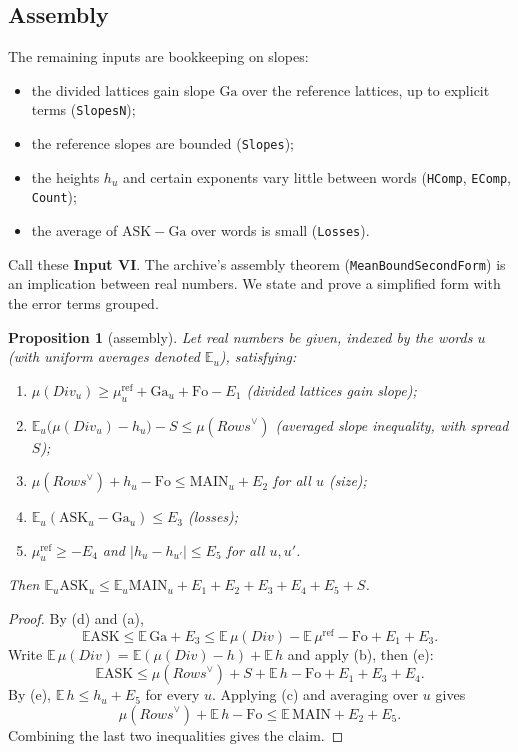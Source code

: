 \documentclass[11pt]{amsart}
\newtheorem{proposition}[theorem]{Proposition}
\theoremstyle{definition}
\theoremstyle{remark}
\newcommand{\dual}{^{\vee}}
\newcommand{\ASK}{\mathrm{ASK}}
\newcommand{\MAIN}{\mathrm{MAIN}}
\begin{document}
\subsection{Assembly}
The remaining inputs are bookkeeping on slopes:
\begin{itemize}
\item the divided lattices gain slope $\mathrm{Ga}$ over the reference lattices, up to explicit terms (\texttt{SlopesN});
\item the reference slopes are bounded (\texttt{Slopes});
\item the heights $h_u$ and certain exponents vary little between words (\texttt{HComp}, \texttt{EComp}, \texttt{Count});
\item the average of $\ASK-\mathrm{Ga}$ over words is small (\texttt{Losses}).
\end{itemize}
Call these \textbf{Input VI}. The archive's assembly theorem (\texttt{MeanBoundSecondForm}) is an implication between real numbers. We state and prove a simplified form with the error terms grouped.

\begin{proposition}[assembly]\label{prop:assembly}
Let real numbers be given, indexed by the words $u$ (with uniform averages denoted $\mathbb E_u$), satisfying:
\begin{enumerate}[label=(\alph*)]
\item $\mu(\mathit{Div}_u)\ge\mu^{\mathrm{ref}}_u+\mathrm{Ga}_u+\mathrm{Fo}-E_1$ (divided lattices gain slope);
\item $\mathbb E_u\bigl(\mu(\mathit{Div}_u)-h_u\bigr)-S\le\mu(\mathit{Rows}\dual)$ (averaged slope inequality, with spread $S$);
\item $\mu(\mathit{Rows}\dual)+h_u-\mathrm{Fo}\le\MAIN_u+E_2$ for all $u$ (size);
\item $\mathbb E_u(\ASK_u-\mathrm{Ga}_u)\le E_3$ (losses);
\item $\mu^{\mathrm{ref}}_u\ge-E_4$ and $|h_u-h_{u'}|\le E_5$ for all $u,u'$.
\end{enumerate}
Then $\mathbb E_u\ASK_u\le\mathbb E_u\MAIN_u+E_1+E_2+E_3+E_4+E_5+S$.
\end{proposition}

\begin{proof}
By (d) and (a),
\[
\mathbb E\ASK\le\mathbb E\,\mathrm{Ga}+E_3\le\mathbb E\,\mu(\mathit{Div})-\mathbb E\,\mu^{\mathrm{ref}}-\mathrm{Fo}+E_1+E_3 .
\]
Write $\mathbb E\,\mu(\mathit{Div})=\mathbb E(\mu(\mathit{Div})-h)+\mathbb E\,h$ and apply (b), then (e):
\[
\mathbb E\ASK\le\mu(\mathit{Rows}\dual)+S+\mathbb E\,h-\mathrm{Fo}+E_1+E_3+E_4 .
\]
By (e), $\mathbb E\,h\le h_u+E_5$ for every $u$. Applying (c) and averaging over $u$ gives
\[
\mu(\mathit{Rows}\dual)+\mathbb E\,h-\mathrm{Fo}\le\mathbb E\,\MAIN+E_2+E_5 .
\]
Combining the last two inequalities gives the claim.
\end{proof}
\end{document}
